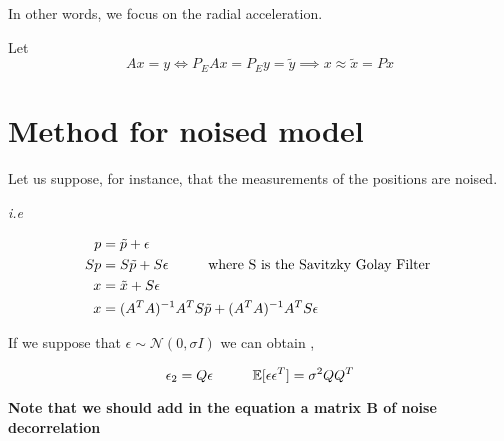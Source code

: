 \documentclass{article}
\begin{document}
In other words, we focus on the radial acceleration. 

Let \begin{equation*}
    A x = y \Leftrightarrow P_E A x =P_E y = \tilde{y}  
    \implies x \approx  \tilde{x} = Px
\end{equation*}


\section{Method for noised model }

Let us suppose, for instance, that the measurements of the positions are noised. 

\textit{i.e} 



\begin{align*}
    p &= \tilde{p} + \epsilon \\ 
    Sp &= S\tilde{p} + S\epsilon \text{\hspace{1 cm}where S is the Savitzky Golay Filter }\\
    x &= \tilde{x} + S\epsilon\\
    x &= (A^TA)^{-1} A^T  S \tilde{p} +  (A^TA)^{-1} A^T  S \epsilon 
\end{align*}

If we suppose that $ \epsilon \sim \mathcal{N}(0, \sigma I) $ we can obtain , 

\[   \epsilon_2 = Q \epsilon   \text{\hspace*{1 cm}} \mathbb{E}[\epsilon \epsilon^T]  = \sigma^2 Q Q^T  
\]



\textbf{Note that we should add in the equation a matrix B of noise decorrelation  }







\newpage


\end{document}
